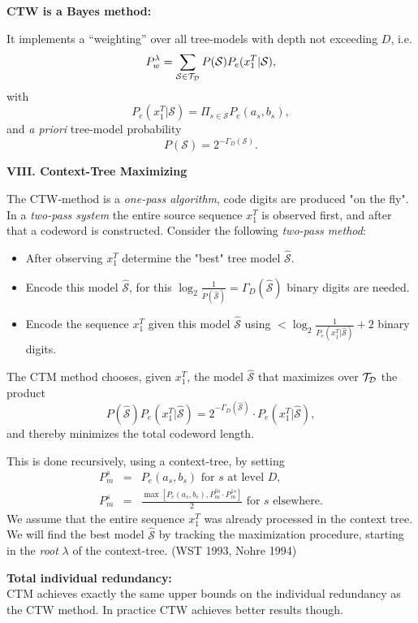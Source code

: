 \documentclass[a4paper,landscape]{slides} %
\newcommand{\cS}{{\mathcal{S}}}
\newcommand{\xT}{x_{1}^{T}}
\newcommand{\cTD}{{\cal{T}_{D}}}
\newcommand{\GD}{{\Gamma_{D}}}
\begin{document}
\begin{slide}{\bf\large\color{red} CTW is a Bayes method:}

It implements a ``weighting'' over all tree-models with depth not
exceeding $D$, i.e.
\[
P_{w}^{\lambda}
= \sum_{\cS \in \cTD} P(\cS) P_{e}(\xT |\cS),
\]
with
\[
P_{e}(\xT|\cS) = \Pi_{s\in\cS} P_{e}(a_{s},b_{s}),
\]
and {\em a priori} tree-model probability
\[
P(\cS) = 2^{-\GD(\cS)}.
\]
\end{slide}
\begin{slide}{\bf\Large\color{blue} VIII. Context-Tree Maximizing}

The CTW-method is a {\em one-pass algorithm}, code digits are produced "on the fly".
In a {\em two-pass system} the entire source sequence $\xT$ is observed first, and after that a codeword is constructed.
Consider the following {\em two-pass method}:
\begin{itemize}
\item\vspace{-10mm}
After observing $\xT$ determine the "best" tree model ${\mathcal{\widehat{S}}}$.
\item\vspace{-10mm}
Encode this model $\mathcal{\widehat{S}}$, for this $\log_{2}\frac{1}{P(\mathcal{\widehat{S}})}= \GD(\mathcal{\widehat{S}}) $ binary digits are needed.
\item\vspace{-10mm}
Encode the sequence $\xT$ given this model $\mathcal{\widehat{S}}$ using $< \log_{2}\frac{1}{P_e(\xT|\mathcal{\widehat{S}})} + 2$ binary digits.
\end{itemize}

The CTM method chooses, given $\xT$, the model $\mathcal{\widehat{S}}$ that maximizes over $\cTD$ the product
\[
P(\mathcal{\widehat{S}}) P_{e}(\xT| \mathcal{\widehat{S}} ) =
2^{-\GD(\mathcal{\widehat{S}}) } \cdot P_{e}( \xT|\mathcal{\widehat{S}}),
\]
and thereby minimizes the total codeword length.
\end{slide}
\begin{slide}
This is done recursively, using a context-tree, by setting
\begin{eqnarray*}
P_{m}^{s} &=& P_{e}(a_{s},b_{s}) \text{ for $s$ at level $D$,} \\
P_{m}^{s} &=& \frac{ \max [ P_{e}(a_{s},b_{s}) , P_{m}^{0s}\cdot
P_{m}^{1s} ] } {2} \text{ for $s$ elsewhere.}
\end{eqnarray*}
We assume that the entire sequence $\xT$ was already processed in the context tree.\\
We will find the best model ${\mathcal{\widehat{S}}}$ by tracking the
maximization procedure, starting in the {\em root} $\lambda$ of
the context-tree. (WST 1993, Nohre 1994)

{\bf Total individual redundancy:} \\
CTM achieves exactly the same upper bounds on
the individual redundancy as the CTW method. In practice CTW
achieves better results though.
\end{slide}
\end{document}
